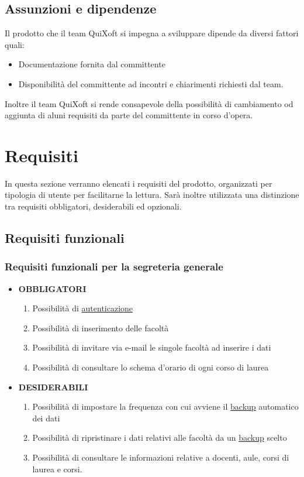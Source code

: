 \documentclass[11pt,a4paper]{article}
\begin{document}
\subsection{Assunzioni e dipendenze}
Il prodotto che il team QuiXoft si impegna a sviluppare dipende da diversi fattori quali:
\begin{itemize}
 \item Documentazione fornita dal committente
 \item Disponibilità del committente ad incontri e chiarimenti richiesti dal team.
\end{itemize}
Inoltre il team QuiXoft si rende consapevole della possibilità di cambiamento od aggiunta di aluni requisiti da parte del committente in corso d'opera.
\section{Requisiti} \label{requisiti}
In questa sezione verranno elencati i requisiti del prodotto, organizzati per tipologia di utente per facilitarne la lettura. Sarà inoltre utilizzata una distinzione tra requisiti obbligatori, desiderabili ed opzionali.
\subsection{Requisiti funzionali}
\subsubsection{Requisiti funzionali per la segreteria generale}
\begin{itemize}
\item \textbf{OBBLIGATORI}
\begin{enumerate}
\item Possibilità di \underline{autenticazione}
\item Possibilità di inserimento delle facoltà
\item Possibilità di invitare via e-mail le singole facoltà ad inserire i dati
\item Possibilità di consultare lo schema d'orario di ogni corso di laurea
\end{enumerate}
\item \textbf{DESIDERABILI}
\begin{enumerate}
\item Possibilità di impostare la frequenza con cui avviene il \underline{backup} automatico dei dati
\item Possibilità di ripristinare i dati relativi alle facoltà da un \underline{backup} scelto
\item Possibilità di consultare le informazioni relative a docenti, aule, corsi di laurea e corsi.
\end{enumerate}
\end{itemize}
\end{document}
